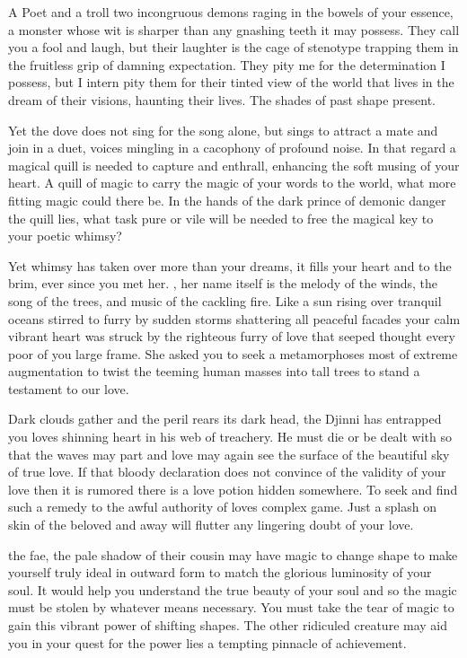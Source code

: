\documentclass[char]{guildcamp2}
\begin{document}
\name{\cTroll{}}




A Poet and a troll two incongruous demons raging in the bowels of your essence, a monster whose wit is sharper than any gnashing teeth it may possess. They call you a fool and laugh, but their laughter is the cage of stenotype trapping them in the fruitless grip of damning expectation. They pity me for the determination I possess, but I intern pity them for their tinted view of the world that lives in the dream of their visions, haunting their lives. The shades of past shape present. 

Yet the dove does not sing for the song alone, but sings to attract a mate and join in a duet, voices mingling in a cacophony of profound noise. In that regard a magical quill is needed to capture and enthrall, enhancing the soft musing of your heart. A quill of magic to carry the magic of your words to the world, what more fitting magic could there be. In the hands of the dark prince of demonic danger \cDemon{} the quill lies, what task pure or vile will be needed to free the magical key to your poetic whimsy? 

Yet whimsy has taken over more than your dreams, it fills your heart and to the brim, ever since you met her. \cTreeFae{}, her name itself is the melody of the winds, the song of the trees, and music of the cackling fire. Like a sun rising over tranquil oceans stirred to furry by sudden storms shattering all peaceful facades your calm vibrant heart was struck by the righteous furry of love that seeped thought every poor of you large frame. She asked you to seek a metamorphoses most of extreme augmentation to twist the teeming human masses into tall trees to stand a testament to our love.

Dark clouds gather and the peril rears its dark head, the Djinni \cWizard{} has entrapped you loves shinning heart in his web of treachery. He must die or be dealt with so that the waves may part and love may again see the surface of the beautiful sky of true love. If that bloody declaration does not convince \cTreeFae{} of the validity of your love then it is rumored there is a love potion hidden somewhere. To seek and find such a remedy to the awful authority of loves complex game. Just a splash on skin of the beloved and away will flutter any lingering doubt of your love. 

\cBabyFae{} the fae, the pale shadow of their cousin \cTreeFae{} may have magic to change shape to make yourself truly ideal in outward form to match the glorious luminosity of your soul. It would help you understand the true beauty of your soul and so the magic must be stolen by whatever means necessary. You must take the tear of magic to gain this vibrant power of shifting shapes. The other ridiculed creature may aid you in your quest for the power lies a tempting pinnacle of achievement. 
\end{document}
